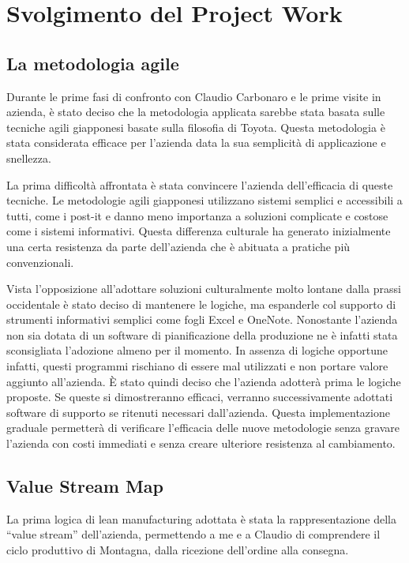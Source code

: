 \chapter{Svolgimento del Project Work}

\section{La metodologia agile}
\begin{multicols}{2}
	Durante le prime fasi di confronto con Claudio Carbonaro e le prime visite in azienda, è stato deciso che la metodologia applicata sarebbe stata basata sulle tecniche agili giapponesi basate sulla filosofia di Toyota. Questa metodologia è stata considerata efficace per l’azienda data la sua semplicità di applicazione e snellezza.

	La prima difficoltà affrontata è stata convincere l’azienda dell’efficacia di queste tecniche. Le metodologie agili giapponesi utilizzano sistemi semplici e accessibili a tutti, come i post-it e danno meno importanza a soluzioni complicate e costose come i sistemi informativi. Questa differenza culturale ha generato inizialmente una certa resistenza da parte dell’azienda che è abituata a pratiche più convenzionali.

	Vista l’opposizione all’adottare soluzioni culturalmente molto lontane dalla prassi occidentale è stato deciso di mantenere le logiche, ma espanderle col supporto di strumenti informativi semplici come fogli Excel e OneNote.
	Nonostante l’azienda non sia dotata di un software di pianificazione della produzione ne è infatti stata sconsigliata l’adozione almeno per il momento.
	In assenza di logiche opportune infatti, questi programmi rischiano di essere mal utilizzati e non portare valore aggiunto all’azienda.
	È stato quindi deciso che l'azienda adotterà prima le logiche proposte. Se queste si dimostreranno efficaci, verranno successivamente adottati software di supporto se ritenuti necessari dall’azienda. Questa implementazione graduale permetterà di verificare l’efficacia delle nuove metodologie senza gravare l’azienda con costi immediati e senza creare ulteriore resistenza al cambiamento.

\section{Value Stream Map}
	La prima logica di lean manufacturing adottata è stata la rappresentazione della “value stream” dell’azienda, permettendo a me e a Claudio di comprendere il ciclo produttivo di Montagna, dalla ricezione dell’ordine alla consegna.


\end{multicols}
